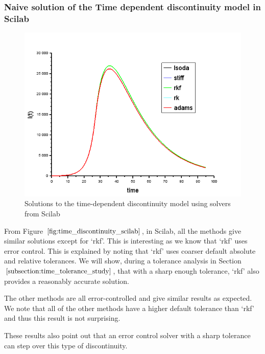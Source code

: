 \subsubsection{Naive solution of the Time dependent discontinuity model in Scilab}
\begin{figure}[H]
\centering
\includegraphics[width=0.7\linewidth]{./figures/time_discontinuity_scilab}
\caption{Solutions to the time-dependent discontinuity model using solvers from Scilab}
\label{fig:time_discontinuity_scilab}
\end{figure}
From Figure $\ref{fig:time_discontinuity_scilab}$, in Scilab, all the methods give similar solutions except for `rkf'. This is interesting as we know that `rkf' uses error control. This is explained by noting that `rkf' uses coarser default absolute and relative tolerances. We will show, during a tolerance analysis in Section $\ref{subsection:time_tolerance_study}$, that with a sharp enough tolerance, `rkf' also provides a reasonably accurate solution.

The other methods are all error-controlled and give similar results as expected. We note that all of the other methods have a higher default tolerance than `rkf' and thus this result is not surprising.

These results also point out that an error control solver with a sharp tolerance can step over this type of discontinuity.

